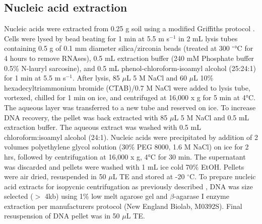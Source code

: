 \documentclass{article}
\begin{document}
\subsection{Nucleic acid extraction}
Nucleic acids were extracted from 0.25 g soil using a modified Griffiths
protocol \citep{Griffiths_2000}. Cells were lysed by bead beating for
1 min at 5.5 m s$^{-1}$ in 2 mL lysis tubes containing 0.5 g of 0.1 mm diameter
  silica/zirconia beads (treated at 300 $^{\circ}$°C for 4 hours to remove RNAses), 0.5 mL
  extraction buffer (240 mM Phosphate buffer 0.5\% N-lauryl sarcosine), and 0.5
  mL phenol-chloroform-isoamyl alcohol (25:24:1) for 1 min at
5.5 m s$^{-1}$. After lysis, 85 $\mu$L 5 M NaCl and 60 $\mu$L 10\% hexadecyltriammonium
  bromide (CTAB)/0.7 M NaCl were added to lysis tube, vortexed, chilled for
  1 min on ice, and centrifuged at 16,000 x g for 5 min at 4°C. The aqueous
  layer was transferred to a new tube and reserved on ice. To increase DNA
  recovery, the pellet was back extracted with 85 $\mu$L 5 M NaCl and
0.5 mL extraction buffer. The aqueous extract was washed with 0.5 mL
chloroform:isoamyl alcohol (24:1). Nucleic acids were precipitated by addition
of 2 volumes polyethylene glycol solution (30\% PEG 8000, 1.6 M NaCl) on ice
for 2 hrs, followed by centrifugation at 16,000 x g, 4°C for 30 min. The
supernatant was discarded and pellets were washed with 1 mL ice cold 70\% EtOH.
Pellets were air dried, resuspended in 50 $\mu$L TE and stored at -20
$^{\circ}$C. To prepare nucleic acid extracts for isopycnic centrifugation as
previously described \citep{Buckley_2007}, DNA was size selected ($>$ 4kb)
using 1\% low melt agarose gel and $\beta$-agarase I enzyme extraction per
manufacturers protocol (New England Biolab, M0392S).  Final resuspension of DNA
pellet was in 50 $\mu$L TE.   
\end{document}
